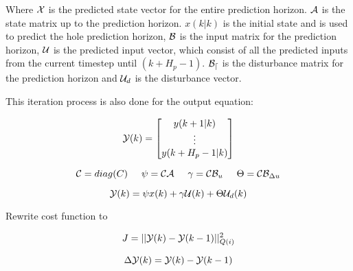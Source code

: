 Where $\CMcal{X}$ is the predicted state vector for the entire prediction horizon. $\CMcal{A}$ is the state matrix up to the prediction horizon. $x(k|k)$ is the initial state and is used to predict the hole prediction horizon, $\CMcal{B}$ is the input matrix for the prediction horizon, $\CMcal{U}$ is the predicted input vector, which consist of all the predicted inputs from the current timestep until $(k+H_p-1)$. $\CMcal{B_d}$ is the disturbance matrix for the prediction horizon and $\CMcal{U}_d$ is the disturbance vector. 

This iteration process is also done for the output equation:

\begin{equation}
	\CMcal{Y}(k)= 
	\begin{bmatrix}
	y(k+1|k)\\
	\vdots\\
	y(k+H_p-1|k)
	\end{bmatrix}
\end{equation}



\begin{equation}
	\CMcal{C} = diag(C) \hspace{5mm} \psi = \CMcal{C}\CMcal{A}  \hspace{5mm} \gamma = \CMcal{C}\CMcal{B}_u \hspace{5mm}  \Theta = \CMcal{C}\CMcal{B}_{\Delta u}
\end{equation}

\begin{equation}\label{eq:lifted_output_with_states_inserted}
	\CMcal{Y}(k) = \psi x(k) + \gamma \CMcal{U}(k) + \Theta \CMcal{U}_d(k)
\end{equation}





Rewrite cost function to

\begin{equation}
	J = ||\CMcal{Y}(k)-\CMcal{Y}(k-1)||_{Q(i)}^2
\end{equation}

\begin{equation}
	\Delta \CMcal{Y}(k) =\CMcal{Y}(k)-\CMcal{Y}(k-1) 
\end{equation}

